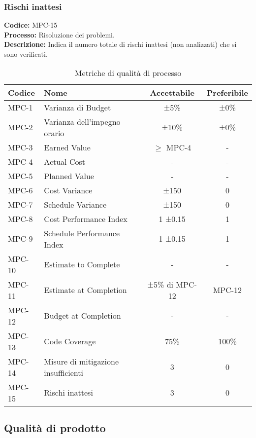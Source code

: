 \subsubsection{Rischi inattesi}
\textbf{Codice:} MPC-15 \\
\textbf{Processo:} Risoluzione dei problemi. \\
\textbf{Descrizione:} Indica il numero totale di rischi inattesi (non analizzati) che si sono verificati.

\begin{table}[h!]
    \centering
    \renewcommand{\arraystretch}{1.5}
    \setlength{\tabcolsep}{5pt}
    \begin{tabularx}{\textwidth}{|l|X|c|c|}
    \hline
    \rowcolor[HTML]{FFD700}
    \textbf{Codice} & \textbf{Nome} & \textbf{Accettabile} & \textbf{Preferibile} \\ \hline
    MPC-1 & Varianza di Budget & ±5\% & ±0\% \\ \hline
    MPC-2 & Varianza dell’impegno orario & ±10\% & ±0\% \\ \hline
    MPC-3 & Earned Value & \(\geq\) MPC-4 & - \\ \hline
    MPC-4 & Actual Cost & - & - \\ \hline
    MPC-5 & Planned Value & - & - \\ \hline
    MPC-6 & Cost Variance & ±150 & 0 \\ \hline
    MPC-7 & Schedule Variance & ±150 & 0 \\ \hline
    MPC-8 & Cost Performance Index & 1 ±0.15 & 1 \\ \hline
    MPC-9 & Schedule Performance Index & 1 ±0.15 & 1 \\ \hline
    MPC-10 & Estimate to Complete & - & - \\ \hline
    MPC-11 & Estimate at Completion & ±5\% di MPC-12 & MPC-12 \\ \hline
    MPC-12 & Budget at Completion & - & - \\ \hline
    MPC-13 & Code Coverage & 75\% & 100\% \\ \hline
    MPC-14 & Misure di mitigazione insufficienti & 3 & 0 \\ \hline
    MPC-15 & Rischi inattesi & 3 & 0 \\ \hline
    \end{tabularx}
    \caption{Metriche di qualità di processo}
    \label{tab:metriche-qualita-processo}
\end{table}



\subsection{Qualità di prodotto}
\label{sec:Qualità di prodotto}

